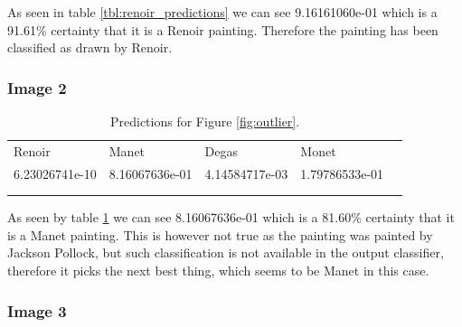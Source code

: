 As seen in table \ref{tbl:renoir_predictions} we can see 9.16161060e-01 which is a 91.61\% certainty that it is a Renoir painting. Therefore the painting has been classified as drawn by Renoir.



\subsubsection*{Image 2}

\begin{table}[H]
    \centering
    \caption{Predictions for Figure \ref{fig:outlier}.}
    \label{tbl:outlier_predictions}
    \begin{tabular}{lllll}
    \cline{1-4}
    \multicolumn{1}{|l|}{Renoir}         & \multicolumn{1}{l|}{Manet}          & \multicolumn{1}{l|}{Degas}          & \multicolumn{1}{l|}{Monet}          &  \\ \cline{1-4}
    \multicolumn{1}{|l|}{6.23026741e-10} & \multicolumn{1}{l|}{8.16067636e-01} & \multicolumn{1}{l|}{4.14584717e-03} & \multicolumn{1}{l|}{1.79786533e-01} &  \\ \cline{1-4}
                                         &                                     &                                     &                                     &  \\
                                         &                                     &                                     &                                     & 
    \end{tabular}
\end{table}

As seen by table \ref{tbl:outlier_predictions} we can see 8.16067636e-01 which is a 81.60\% certainty that it is a Manet painting. This is however not true as the painting was painted by Jackson Pollock, but such classification is not available in the output classifier, therefore it picks the next best thing, which seems to be Manet in this case. 


\subsubsection*{Image 3}

